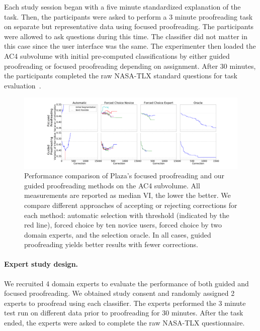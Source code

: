 Each study session began with a five minute standardized explanation of the task. Then, the participants were asked to perform a 3 minute proofreading task on separate but representative data using focused proofreading. The participants were allowed to ask questions during this time. The classifier did not matter in this case since the user interface was the same. The experimenter then loaded the AC4 subvolume with initial pre-computed classifications by either guided proofreading or focused proofreading depending on assignment. After 30 minutes, the participants completed the raw NASA-TLX standard questions for task evaluation~\cite{NASATLX}.
\begin{figure}[t]
\begin{center}
\includegraphics[width=\linewidth]{gfx/ac4trails.pdf}
\end{center}
  \vspace{-4mm}
   \caption{Performance comparison of Plaza's focused proofreading and our guided proofreading methods on the AC4 subvolume. All measurements are reported as median VI, the lower the better. We compare different approaches of accepting or rejecting corrections for each method: automatic selection with threshold (indicated by the red line), forced choice by ten novice users, forced choice by two domain experts, and the selection oracle. In all cases, guided proofreading yields better results with fewer corrections.}
\label{fig:ac4trails}
\end{figure}
\paragraph{Expert study design.} We recruited 4 domain experts to evaluate the performance of both guided and focused proofreading. We obtained study consent and randomly assigned 2 experts to proofread using each classifier. The experts performed the 3 minute test run on different data prior to proofreading for 30 minutes. After the task ended, the experts were asked to complete the raw NASA-TLX questionnaire.

